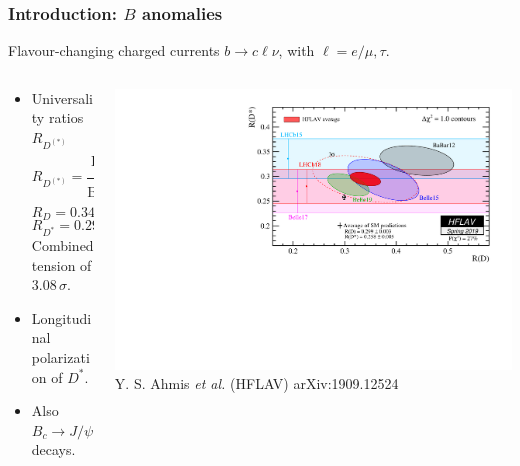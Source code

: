 \documentclass[mathserif, 10pt, dvipsnames]{beamer}
\newcommand\colorcite[1]{{\scriptsize\color{unizarblue}#1}}
\begin{document}
\begin{frame}\frametitle{Introduction: $B$ anomalies}
    Flavour-changing charged currents $b\to c \ell \nu$, with $\ell = e/\mu, \tau$.
    \begin{columns}
        \begin{column}{0.55\textwidth}

            \begin{itemize}
                \item Universality ratios $R_{D^{(*)}}$
                      $$R_{D^{(*)}} = \frac{\mathrm{BR}(B\to D^{(*)}\tau \nu)}{\mathrm{BR}(B\to D^{(*)}\ell \nu)}\,, $$
                      $$R_D = 0.340 \pm 0.027 \pm 0.013\,,$$
                      $$R_{D^*} = 0.295 \pm 0.011 \pm 0.008\,.$$
Combined tension of $3.08\,\sigma$.\\[0.6em]
                \item Longitudinal polarization of $D^*$.
                \item Also $B_c \to J/\psi \ell\nu$ decays.
            \end{itemize}

        \end{column}
        \begin{column}{0.5\textwidth}
\includegraphics[width=\columnwidth]{figures/rdrds_spring2019.pdf}\\
\colorcite{Y. S. Ahmis \textit{et al.} (HFLAV) arXiv:1909.12524}
        \end{column}
\end{columns}
\end{frame}
\end{document}

